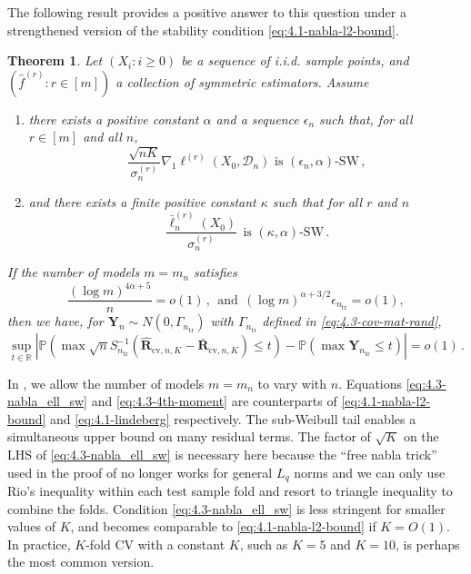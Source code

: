 \documentclass[11pt]{article}
\theoremstyle{plain}
\newtheorem{theorem}{Theorem}[section]
\newcommand{\cv}{{\mathrm{cv}}}
\newcommand{\tr}{{\mathrm{tr}}}
\newcommand{\D}{{\mathcal{D}}}
\begin{document}
The following result provides a positive answer to this question under a strengthened version of the stability condition \eqref{eq:4.1-nabla-l2-bound}.
\begin{theorem}
    \label{thm:4.3-hd-cv-clt-rand}
    Let $(X_i:i\ge 0)$ be a sequence of i.i.d. sample points, and $(\hat f^{(r)}:r\in[m])$ a collection of symmetric estimators. Assume
    \begin{enumerate}
        \item there exists a positive constant $\alpha$ and a sequence $\epsilon_n$ such that, for all $r\in[m]$ and all $n$,
    \begin{equation}
        \label{eq:4.3-nabla_ell_sw}
        \frac{\sqrt{nK}}{\sigma_n^{(r)}}\nabla_1 \ell^{(r)}(X_0,\D_n) \text{ is } (\epsilon_n,\alpha)\text{-SW}\,,
    \end{equation}
 \item and there exists a finite positive constant $\kappa$ such that for all $r$ and $n$
    \begin{equation}
        \label{eq:4.3-4th-moment}
       \frac{\bar\ell_n^{(r)}(X_0)}{\sigma_n^{(r)}} ~~\text{is }(\kappa,\alpha)\text{-SW}\,.
    \end{equation}
    \end{enumerate}
If the number of models $m=m_n$ satisfies
\begin{equation}
    \label{eq:4.3-m-bound}
    \frac{(\log m)^{4\alpha+5}}{n} = o(1)\,,~~\text{and}~~(\log m)^{\alpha+3/2}\epsilon_{n_\tr} = o(1),
\end{equation}
    then we have, for $\mathbf Y_n\sim N(0,\Gamma_{n_\tr})$ with $\Gamma_{n_\tr}$ defined in \eqref{eq:4.3-cov-mat-rand},
    \begin{equation}
        \label{eq:4.3-hd-cv-gaussian-comp}
       \sup_{t\in \mathbb R}\left|\mathbb P\left(\max \sqrt{n} S_{n_\tr}^{-1}(\hat{\mathbf R}_{\cv,n,K}-\bar{\mathbf R}_{\cv,n,K})\le t\right)-\mathbb P\left(\max \mathbf Y_{n_\tr}\le t\right)\right|=o(1)\,.
    \end{equation}
\end{theorem}

In , we allow the number of models $m=m_n$ to vary with $n$.  Equations \eqref{eq:4.3-nabla_ell_sw} and \eqref{eq:4.3-4th-moment} are counterparts of \eqref{eq:4.1-nabla-l2-bound} and \eqref{eq:4.1-lindeberg} respectively.  The sub-Weibull tail enables a simultaneous upper bound on many residual terms.  The factor of $\sqrt{K}$ on the LHS of \eqref{eq:4.3-nabla_ell_sw} is necessary here because the ``free nabla trick'' used in the proof of  no longer works for general $L_q$ norms and we can only use Rio's inequality within each test sample fold and resort to triangle inequality to combine the folds.  
Condition \eqref{eq:4.3-nabla_ell_sw} is less stringent for smaller values of $K$, and becomes comparable to \eqref{eq:4.1-nabla-l2-bound} if $K=O(1)$.
In practice, $K$-fold CV with a constant $K$, such as $K=5$ and $K=10$, is perhaps the most common version.
\end{document}

